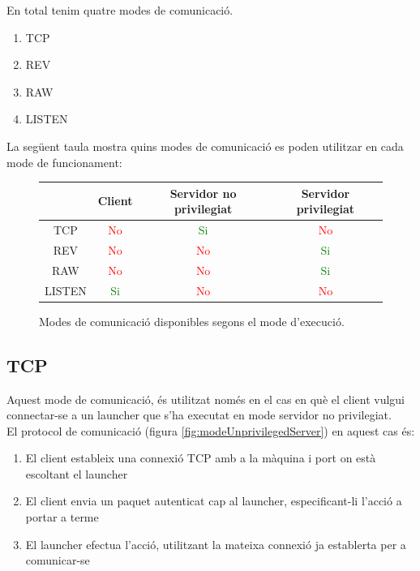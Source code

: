 En total tenim quatre modes de comunicació. \\

\begin{enumerate}
    \item TCP
    \item REV
    \item RAW
    \item LISTEN
\end{enumerate}

La següent taula mostra quins modes de comunicació es poden utilitzar en cada mode de funcionament:

\begin{figure}[htp]
    \centering
    \begin{tabular}{|c|c|c|c|}
        \hline
               & \textbf{Client} & \textbf{Servidor no privilegiat} & \textbf{Servidor privilegiat} \\ \hline
        TCP    & \textcolor{Red}{No}   & \textcolor{Green}{Si} & \textcolor{Red}{No}  \\ \hline
        REV    & \textcolor{Red}{No}   & \textcolor{Red}{No}   & \textcolor{Green}{Si}  \\ \hline
        RAW    & \textcolor{Red}{No}   & \textcolor{Red}{No}   & \textcolor{Green}{Si}  \\ \hline
        LISTEN & \textcolor{Green}{Si} & \textcolor{Red}{No}   & \textcolor{Red}{No}    \\ \hline
    \end{tabular}
    \caption{Modes de comunicació disponibles segons el mode d'execució.}
    \label{fig:tableModesRelation}
\end{figure}

\subsection{TCP}

Aquest mode de comunicació, és utilitzat només en el cas en què el client vulgui connectar-se a un launcher que
s'ha executat en mode servidor no privilegiat. \\

El protocol de comunicació (figura \ref{fig:modeUnprivilegedServer}) en aquest cas és: \\

\begin{enumerate}
    \item El client estableix una connexió TCP amb a la màquina i port on està escoltant el launcher
    \item El client envia un paquet autenticat cap al launcher, especificant-li l'acció a portar a terme
    \item El launcher efectua l'acció, utilitzant la mateixa connexió ja establerta per a comunicar-se
\end{enumerate}

